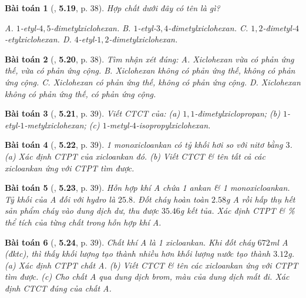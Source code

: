 \documentclass{article}
\numberwithin{equation}{section}
\newtheorem{baitoan}{Bài toán}[section]
\begin{document}
\begin{baitoan}[\cite{SBT_Hoa_Hoc_11_co_ban}, \textbf{5.19}, p. 38]
	Hợp chất dưới đây có tên là gì?
	\begin{center}
	\end{center}
	{\sf A.} $1$-etyl-$4,5$-đimetylxiclohexan. {\sf B.} $1$-etyl-$3,4$-đimetylxiclohexan. {\sf C.} $1,2$-đimetyl-$4$-etylxiclohexan. {\sf D.} $4$-etyl-$1,2$-đimetylxiclohexan.	
\end{baitoan}

\begin{baitoan}[\cite{SBT_Hoa_Hoc_11_co_ban}, \textbf{5.20}, p. 38]
	Tìm nhận xét đúng: {\sf A.} Xiclohexan vừa có phản ứng thế, vừa có phản ứng cộng. {\sf B.} Xiclohexan không có phản ứng thế, không có phản ứng cộng. {\sf C.} Xiclohexan có phản ứng thế, không có phản ứng cộng. {\sf D.} Xiclohexan không có phản ứng thế, có phản ứng cộng.
\end{baitoan}

\begin{baitoan}[\cite{SBT_Hoa_Hoc_11_co_ban}, \textbf{5.21}, p. 39]
	Viết CTCT của: (a) $1,1$-đimetylxiclopropan; (b) $1$-etyl-$1$-metylxiclohexan; (c) $1$-metyl-$4$-isopropylxiclohexan.
\end{baitoan}

\begin{baitoan}[\cite{SBT_Hoa_Hoc_11_co_ban}, \textbf{5.22}, p. 39]
	1 monoxicloankan có tỷ khối hơi so với nitơ bằng $3$. (a) Xác định CTPT của xicloankan đó. (b) Viết CTCT \& tên tất cả các xicloankan ứng với CTPT tìm được.
\end{baitoan}

\begin{baitoan}[\cite{SBT_Hoa_Hoc_11_co_ban}, \textbf{5.23}, p. 39]
	Hỗn hợp khí A chứa 1 ankan \& 1 monoxicloankan. Tỷ khối của A đối với hydro là $25.8$. Đốt cháy hoàn toàn $2.58$\emph{g} A rồi hấp thụ hết sản phẩm cháy vào dung dịch \emph{} dư, thu được $35.46$\emph{g} kết tủa. Xác định CTPT \& \% thể tích của từng chất trong hỗn hợp khí A.
\end{baitoan}

\begin{baitoan}[\cite{SBT_Hoa_Hoc_11_co_ban}, \textbf{5.24}, p. 39]
	Chất khí A là 1 xicloankan. Khi đốt cháy $672$\emph{ml} A (đktc), thì thấy khối lượng \emph{} tạo thành nhiều hơn khối lượng nước tạo thành $3.12$\emph{g}. (a) Xác định CTPT chất A. (b) Viết CTCT \& tên các xicloankan ứng với CTPT tìm được. (c) Cho chất A qua dung dịch brom, màu của dung dịch mất đi. Xác định CTCT đúng của chất A.
\end{baitoan}
\end{document}
